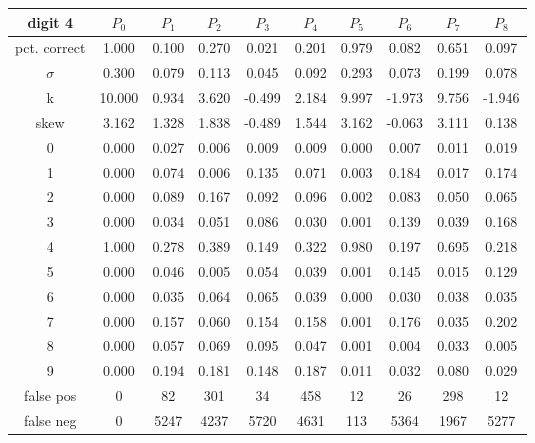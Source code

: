 \documentclass{report}
\begin{document}
\begin{tabular}{ | c ||  c | c | c | c | c | c | c | c | c |}
 digit 4 & $P_0$ & $P_1$ & $P_2$ & $P_3$ & $P_4$ & $P_5$ & $P_6$ & $P_7$ & $P_8$ \\
\hline \hline
pct. correct  & 1.000 & 0.100 & 0.270 & 0.021 & 0.201 & 0.979 & 0.082 & 0.651 & 0.097 \\
\hline
$\sigma$ & 0.300& 0.079& 0.113& 0.045& 0.092& 0.293& 0.073& 0.199& 0.078 \\
\hline
k & 10.000& 0.934& 3.620& -0.499& 2.184& 9.997& -1.973& 9.756& -1.946 \\
\hline
skew & 3.162& 1.328& 1.838& -0.489& 1.544& 3.162& -0.063& 3.111& 0.138 \\
\hline
0 & 0.000 & 0.027 & 0.006 & 0.009 & 0.009 & 0.000 & 0.007 & 0.011 & 0.019 \\
\hline
1 & 0.000 & 0.074 & 0.006 & 0.135 & 0.071 & 0.003 & 0.184 & 0.017 & 0.174 \\
\hline
2 & 0.000 & 0.089 & 0.167 & 0.092 & 0.096 & 0.002 & 0.083 & 0.050 & 0.065 \\
\hline
3 & 0.000 & 0.034 & 0.051 & 0.086 & 0.030 & 0.001 & 0.139 & 0.039 & 0.168 \\
\hline
4 & 1.000 & 0.278 & 0.389 & 0.149 & 0.322 & 0.980 & 0.197 & 0.695 & 0.218 \\
\hline
5 & 0.000 & 0.046 & 0.005 & 0.054 & 0.039 & 0.001 & 0.145 & 0.015 & 0.129 \\
\hline
6 & 0.000 & 0.035 & 0.064 & 0.065 & 0.039 & 0.000 & 0.030 & 0.038 & 0.035 \\
\hline
7 & 0.000 & 0.157 & 0.060 & 0.154 & 0.158 & 0.001 & 0.176 & 0.035 & 0.202 \\
\hline
8 & 0.000 & 0.057 & 0.069 & 0.095 & 0.047 & 0.001 & 0.004 & 0.033 & 0.005 \\
\hline
9 & 0.000 & 0.194 & 0.181 & 0.148 & 0.187 & 0.011 & 0.032 & 0.080 & 0.029 \\
\hline
false pos  & 0 & 82 & 301 & 34 & 458 & 12 & 26 & 298 & 12 \\
\hline
false neg  & 0 & 5247 & 4237 & 5720 & 4631 & 113 & 5364 & 1967 & 5277 \\
\hline
\end{tabular}


\newpage
\end{document}
